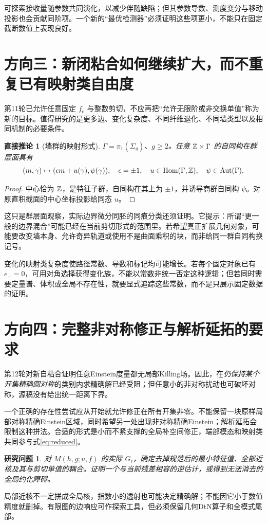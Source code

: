 \documentclass[UTF8,fontset=fandol,zihao=-4]{ctexart}
\theoremstyle{research}
\newtheorem{lemma}[sourceprop]{直接推论}
\newtheorem{target}[sourceprop]{研究问题}
\begin{document}
可探索接收量随参数共同演化，以减少伴随缺陷；但其参数导数、测度变分与移动投影也会贡献同阶项。一个新的“最优检测器”必须证明这些项更小，不能只在固定截断数值上表现良好。

\section{方向三：新闭粘合如何继续扩大，而不重复已有映射类自由度}
第11轮已允许任意固定 $f_e$ 与整数剪切，不应再把“允许无限阶或非交换单值”称为新的目标。值得研究的是更多边、变化复杂度、不同纤维退化、不同墙类型以及相同机制的必要条件。

\begin{lemma}[墙群的映射形式]
$\Gamma=\pi_1(\Sigma_g)$、$g\ge2$。任意 $\mathbb Z\times\Gamma$ 的自同构在群层面具有
\[
 (m,\gamma)\mapsto(\epsilon m+u(\gamma),\psi(\gamma)),
 \quad\epsilon=\pm1,\quad u\in\operatorname{Hom}(\Gamma,\mathbb Z),
 \quad\psi\in\operatorname{Aut}(\Gamma).
\]
\end{lemma}
\begin{proof}
中心恰为 $\mathbb Z$，是特征子群，自同构在其上为 $\pm1$，并诱导商群自同构 $\psi$。对原直积截面的中心坐标投影给同态 $u$。
\end{proof}
这只是群层面观察，实际边界微分同胚的同痕分类还须证明。它提示：所谓“更一般的边界混合”可能已经在当前剪切形式的范围里。若希望真正扩展几何对象，可能要改变墙本身、允许奇异轨道或使用不是曲面乘积的块，而非给同一群自同构换记号。

变化的映射类复杂度使路径常数、导数和标记均可能增长。若每个固定对象已有 $e_-=0$，可用对角选择获得变化族，不能以常数非统一否定这种逻辑；但若同时需要定量谱、体积或全局不存在性，就要显式追踪这些常数，而不是只展示固定数据的证明。

\section{方向四：完整非对称修正与解析延拓的要求}
第12轮对新自粘合证明任意Einstein度量都无局部Killing场。因此，在\emph{仍保持某个开集精确圆对称}的类别内求精确解已经受阻；但任意小的非对称扰动也可破坏对称，源稿没有给出统一距离下界。

一个正确的存在性尝试应从开始就允许修正在所有开集非零。不能保留一块原样局部对称精确Einstein区域，同时希望另一处出现非对称精确Einstein；解析延拓会限制这种拼法。合适的形式是小而不紧支撑的全局补空间修正，端部模态和映射类共同参与式\eqref{eq:reduced}。

\begin{target}
对 $M(h,g;u,f)$ 的实际 $G_\ell$，确定去掉规范后的最小特征值、全部近核及其与剪切单值的耦合。证明一个与当前残差相容的逆估计，或得到无法消去的全局约化障碍。
\end{target}
局部近核不一定拼成全局核，指数小的透射也可能决定精确解；不能因它小于数值精度就删掉。有限图的边响应可作探索工具，但必须保留几何DtN算子和全模式尾部。
\end{document}
